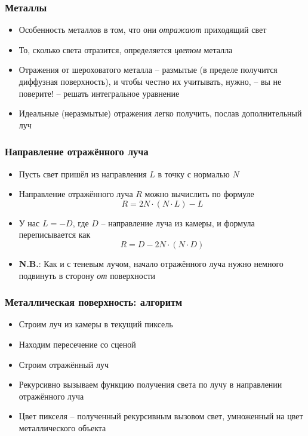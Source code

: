 \documentclass[10pt,handout]{beamer}
\begin{document}
\begin{frame}[fragile]
\frametitle{Металлы}
\begin{itemize}
\item Особенность металлов в том, что они \textit{отражают} приходящий свет
\pause
\item То, сколько света отразится, определяется \textit{цветом} металла
\pause
\item Отражения от шероховатого металла -- размытые (в пределе получится диффузная поверхность), и чтобы честно их учитывать, нужно, -- вы не поверите! -- решать интегральное уравнение
\pause
\item Идеальные (неразмытые) отражения легко получить, послав дополнительный луч
\end{itemize}
\end{frame}

\begin{frame}[fragile]
\frametitle{Направление отражённого луча}
\begin{itemize}
\item Пусть свет пришёл из направления \begin{math}L\end{math} в точку с нормалью \begin{math}N\end{math}
\pause
\item Направление отражённого луча \begin{math}R\end{math} можно вычислить по формуле 
\begin{equation*}
R = 2N\cdot(N \cdot L) - L
\end{equation*}
\pause
\item У нас \begin{math}L=-D\end{math}, где \begin{math}D\end{math} -- направление луча из камеры, и формула переписывается как
\begin{equation*}
R = D - 2N\cdot(N \cdot D)
\end{equation*}
\pause
\item \alert{\textbf{N.B.}}: Как и с теневым лучом, начало отражённого луча нужно немного подвинуть в сторону \textit{от} поверхности
\end{itemize}
\end{frame}

\begin{frame}[fragile]
\frametitle{Металлическая поверхность: алгоритм}
\begin{itemize}
\item Строим луч из камеры в текущий пиксель
\pause
\item Находим пересечение со сценой
\pause
\item Строим отражённый луч
\pause
\item Рекурсивно вызываем функцию получения света по лучу в направлении отражённого луча
\pause
\item Цвет пикселя -- полученный рекурсивным вызовом свет, умноженный на цвет металлического объекта
\end{itemize}
\end{frame}
\end{document}
